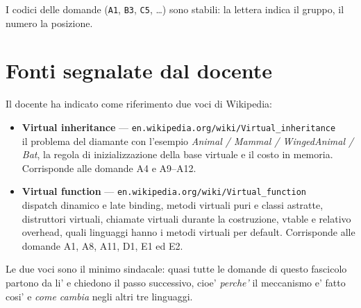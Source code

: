 \documentclass{report}
\newcommand{\code}[1]{\texttt{\small #1}}
\begin{document}
I codici delle domande (\code{A1}, \code{B3}, \code{C5}, \dots) sono stabili:
la lettera indica il gruppo, il numero la posizione.


\section{Fonti segnalate dal docente}

Il docente ha indicato come riferimento due voci di Wikipedia:

\begin{itemize}
    \item \textbf{Virtual inheritance} ---
          \texttt{\small en.wikipedia.org/wiki/Virtual\_inheritance}\\
          il problema del diamante con l'esempio \emph{Animal / Mammal /
          WingedAnimal / Bat}, la regola di inizializzazione della base virtuale
          e il costo in memoria. Corrisponde alle domande A4 e A9--A12.
    \item \textbf{Virtual function} ---
          \texttt{\small en.wikipedia.org/wiki/Virtual\_function}\\ dispatch
          dinamico e late binding, metodi virtuali puri e classi astratte,
          distruttori virtuali, chiamate virtuali durante la costruzione, vtable
          e relativo overhead, quali linguaggi hanno i metodi virtuali per
          default. Corrisponde alle domande A1, A8, A11, D1, E1 ed E2.
\end{itemize}

Le due voci sono il minimo sindacale: quasi tutte le domande di questo fascicolo
partono da li' e chiedono il passo successivo, cioe' \emph{perche'} il
meccanismo e' fatto cosi' e \emph{come cambia} negli altri tre linguaggi.

\end{document}
